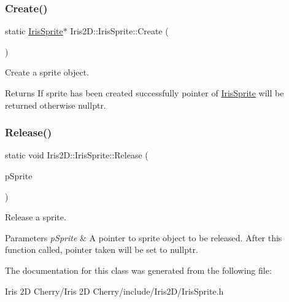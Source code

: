 \subsubsection{\texorpdfstring{Create()}{Create()}}
{\footnotesize\ttfamily static \hyperlink{class_iris2_d_1_1_iris_sprite}{Iris\+Sprite}$\ast$ Iris2\+D\+::\+Iris\+Sprite\+::\+Create (\begin{DoxyParamCaption}{ }\end{DoxyParamCaption})\hspace{0.3cm}{\ttfamily [static]}}



Create a sprite object. 

\begin{DoxyReturn}{Returns}
If sprite has been created successfully pointer of \hyperlink{class_iris2_d_1_1_iris_sprite}{Iris\+Sprite} will be returned otherwise nullptr. 
\end{DoxyReturn}
\mbox{\label{class_iris2_d_1_1_iris_sprite_aa225c6483e0282375187b092ea0cecf9}} 
\subsubsection{\texorpdfstring{Release()}{Release()}}
{\footnotesize\ttfamily static void Iris2\+D\+::\+Iris\+Sprite\+::\+Release (\begin{DoxyParamCaption}\item[{\hyperlink{class_iris2_d_1_1_iris_sprite}{Iris\+Sprite} $\ast$\&}]{p\+Sprite }\end{DoxyParamCaption})\hspace{0.3cm}{\ttfamily [static]}}



Release a sprite. 


\begin{DoxyParams}{Parameters}
{\em p\+Sprite} & A pointer to sprite object to be released. After this function called, pointer taken will be set to nullptr. \\
\hline
\end{DoxyParams}


The documentation for this class was generated from the following file\+:\begin{DoxyCompactItemize}
\item 
Iris 2\+D Cherry/\+Iris 2\+D Cherry/include/\+Iris2\+D/Iris\+Sprite.\+h\end{DoxyCompactItemize}
